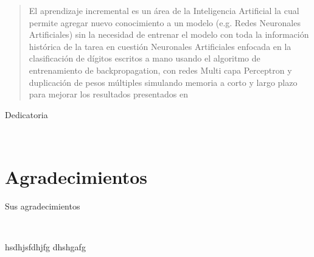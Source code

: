 \documentclass[12pt,a4paper]{report}
\begin{document}
    
    \newpage
    \thispagestyle{empty}


    \doublespacing

    \thispagestyle{empty}
    \begin{abstract}

        El aprendizaje incremental es un área de la Inteligencia Artificial la cual permite agregar nuevo conocimiento 
        a un modelo (e.g. Redes Neuronales Artificiales) sin la necesidad de entrenar el modelo con toda la información 
        histórica de la tarea en cuestión %
        Neuronales Artificiales enfocada en la clasificación de dígitos escritos a mano usando el algoritmo de 
        entrenamiento de backpropagation, con redes Multi capa Perceptron y duplicación de pesos múltiples 
        simulando memoria a corto y largo plazo para mejorar los resultados presentados en %

    \end{abstract}

    \newpage
    \thispagestyle{empty}

    \newpage
    \thispagestyle{empty}

    \vspace*{2in}


    \noindent \hspace{2in} Dedicatoria 

    \newpage
    \thispagestyle{empty}
    ~

    \chapter*{Agradecimientos}
    \thispagestyle{empty}


    Sus agradecimientos

    \tableofcontents

    \listoffigures

    \listoftables



    \newpage
    \thispagestyle{empty}
    ~

    



    \doublespacing



    
    hsdhjsfdhjfg \cite{Elwell2011} dhshgafg

    \newpage
    \thispagestyle{empty}
    
    
    


    


\end{document}
